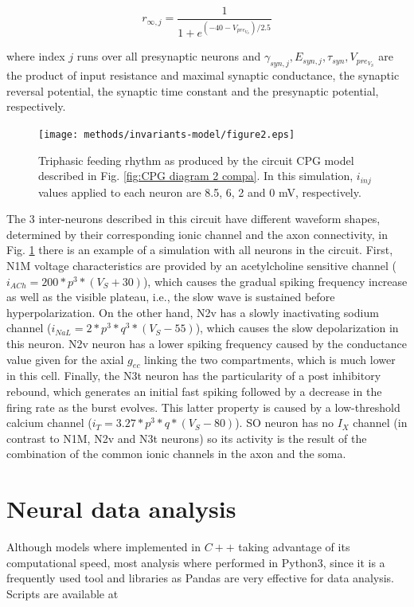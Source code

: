 \begin{equation}
	r_{\infty,j}=\frac{1}{1+e^{(-40-V_{pre_{V_S}})/2.5}}
	\label{eq:syn2}
\end{equation}


\noindent where index $j$ runs over all presynaptic neurons and \(\gamma_{syn,j}, E_{syn,j},\tau_{syn},V_{pre_{V_S}}\) are the product of input resistance and maximal synaptic conductance, the synaptic reversal potential, the synaptic time constant and the presynaptic potential, respectively. 


\begin{figure}[h!]
	\centering
	\texttt{[image: methods/invariants-model/figure2.eps]}
	\caption{Triphasic feeding rhythm as produced by the circuit CPG model described in Fig. \ref{fig:CPG diagram 2 compa}. In this simulation, $i_{inj}$ values applied to each neuron are 8.5, 6, 2 and 0 mV, respectively.}
	\label{fig:model simulation}
\end{figure}

The 3 inter-neurons described in this circuit have different waveform shapes, determined by their corresponding ionic channel and the axon connectivity, in Fig. \ref{fig:model simulation}   there is an example of a simulation with all neurons in the circuit. First, N1M voltage characteristics are provided by an acetylcholine sensitive channel (\(i_{ACh} = 200 * p^3 * (V_S + 30)\)), which causes the gradual spiking frequency increase as well as the visible plateau, i.e., the slow wave is sustained before hyperpolarization. On the other hand, N2v has a slowly inactivating sodium channel (\(i_{NaL} = 2 * p^3 * q^3 * (V_S-55)\)), which causes the slow depolarization in this neuron. N2v neuron has a lower spiking frequency caused by the conductance value given for the axial $g_{ec}$ linking the two compartments, which is much lower in this cell. Finally, the N3t neuron has the particularity of a post inhibitory rebound, which generates an initial fast spiking followed by a decrease in the firing rate as the burst evolves. This latter property is caused by a low-threshold calcium channel (\( i_T = 3.27 * p^3 * q *(V_S-80)\)). SO neuron has no \(I_X\) channel (in contrast to N1M, N2v and N3t neurons) so its activity is the result of the combination of the common ionic channels in the axon and the soma.

 
\section{Neural data analysis}
Although models where implemented in $C++$ taking advantage of its computational speed, most analysis where performed in Python3, since it is a frequently used tool and libraries as Pandas are very effective for data analysis. 
Scripts are available at 

